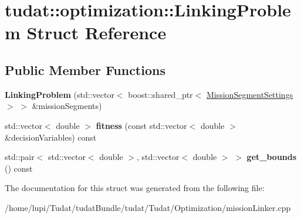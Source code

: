 \hypertarget{structtudat_1_1optimization_1_1LinkingProblem}{}\section{tudat\+:\+:optimization\+:\+:Linking\+Problem Struct Reference}
\label{structtudat_1_1optimization_1_1LinkingProblem}
\subsection*{Public Member Functions}
\begin{DoxyCompactItemize}
\item 
{\bfseries Linking\+Problem} (std\+::vector$<$ boost\+::shared\+\_\+ptr$<$ \hyperlink{structtudat_1_1optimization_1_1MissionSegmentSettings}{Mission\+Segment\+Settings} $>$ $>$ \&mission\+Segments)\hypertarget{structtudat_1_1optimization_1_1LinkingProblem_a75b4c35252219e706f34fb7730197b48}{}\label{structtudat_1_1optimization_1_1LinkingProblem_a75b4c35252219e706f34fb7730197b48}

\item 
std\+::vector$<$ double $>$ {\bfseries fitness} (const std\+::vector$<$ double $>$ \&decision\+Variables) const \hypertarget{structtudat_1_1optimization_1_1LinkingProblem_a8e613543f59f90a9a4d50fa8b6ecf4a7}{}\label{structtudat_1_1optimization_1_1LinkingProblem_a8e613543f59f90a9a4d50fa8b6ecf4a7}

\item 
std\+::pair$<$ std\+::vector$<$ double $>$, std\+::vector$<$ double $>$ $>$ {\bfseries get\+\_\+bounds} () const \hypertarget{structtudat_1_1optimization_1_1LinkingProblem_a97e6719317f76997ea0ad80c1151341e}{}\label{structtudat_1_1optimization_1_1LinkingProblem_a97e6719317f76997ea0ad80c1151341e}

\end{DoxyCompactItemize}


The documentation for this struct was generated from the following file\+:\begin{DoxyCompactItemize}
\item 
/home/lupi/\+Tudat/tudat\+Bundle/tudat/\+Tudat/\+Optimization/mission\+Linker.\+cpp\end{DoxyCompactItemize}
